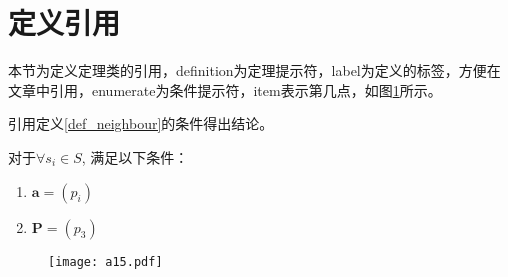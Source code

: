 \documentclass{standalone}
\begin{document}
\section{定义引用}

本节为定义定理类的引用，definition为定理提示符，label为定义的标签，方便在文章中引用，enumerate为条件提示符，item表示第几点，如图\ref{fig_13}所示。

引用定义\ref{def_neighbour}的条件得出结论。

\begin{definition}\label{def_neighbour}
	对于$\forall s_{i} \in S$, 满足以下条件：
	\vspace{-3pt}
	\begin{enumerate}
		\item $\bm{a} = (p_{i})$
		\item $\bm{P} = (p_{3})$
	\end{enumerate} 
\end{definition}

\begin{figure}[htbp]
	\centering
	\texttt{[image: a15.pdf]}
	\label{fig_13}
\end{figure}
\end{document}
